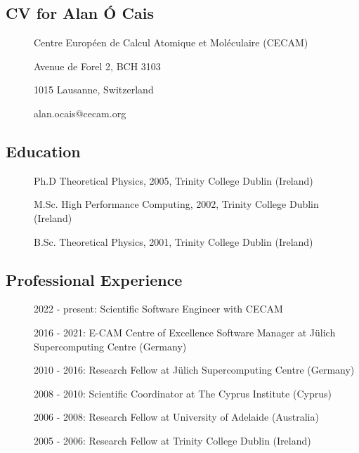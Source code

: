 
\subsection{CV for Alan \'O Cais}

\begin{description}
\item[] Centre Européen de Calcul Atomique et Moléculaire (CECAM)
\item[] Avenue de Forel 2, BCH 3103
\item[] 1015 Lausanne, Switzerland
\item[] alan.ocais@cecam.org
\end{description}

\subsection*{Education}

\begin{description}
\item[] Ph.D Theoretical Physics, 2005, Trinity College Dublin (Ireland)
\item[] M.Sc. High Performance Computing, 2002, Trinity College Dublin (Ireland)
\item[] B.Sc. Theoretical Physics, 2001, Trinity College Dublin (Ireland)
\end{description}

\subsection*{Professional Experience}

\begin{description}
\item[] 2022 - present: Scientific Software Engineer with CECAM
\item[] 2016 - 2021: E-CAM Centre of Excellence Software Manager at J\"ulich Supercomputing Centre (Germany)
\item[] 2010 - 2016: Research Fellow at J\"ulich Supercomputing Centre (Germany)
\item[] 2008 - 2010: Scientific Coordinator at The Cyprus Institute (Cyprus)
\item[] 2006 - 2008: Research Fellow at University of Adelaide (Australia)
\item[] 2005 - 2006: Research Fellow at Trinity College Dublin (Ireland)
\end{description}


